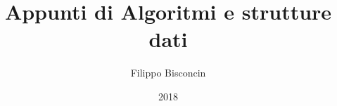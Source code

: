 \documentclass[11pt,a4paper,twoside,openright]{book}
\title{Appunti di Algoritmi e strutture dati}
\author{Filippo Bisconcin}
\date{2018}
\begin{document}
\frontmatter

\begin{titlepage}
\maketitle
\end{titlepage}

\pagestyle{plain}
\tableofcontents
\pagestyle{empty}\cleardoublepage
{}

\pagestyle{fancy} 
\fancyfoot{}                                               
\renewcommand{\chaptermark}[1]{\markboth{\chaptername\ \thechapter.\ #1}{}} 
\renewcommand{\sectionmark}[1]{\markright{\thesection.\ #1}}         
\fancyhead[LE,RO]{\bfseries\thepage}    
                                        
\fancyhead[RE]{\bfseries\leftmark}    
\fancyhead[LO]{\bfseries\rightmark}     
\renewcommand{\headrulewidth}{0.3pt} 

\mainmatter




























\backmatter
\end{document}
